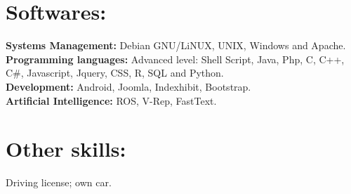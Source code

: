 \documentclass	[10pt,a4paper,oneside]{article}
\newcommand{\seccion}[1]{\vspace*{3mm}\section*{#1}\vspace*{-3mm}}
\begin{document}
\seccion{Softwares:}
\textbf{Systems Management:} Debian GNU/LiNUX, UNIX, Windows and Apache.\\
\textbf{Programming languages:} Advanced level: Shell Script, Java, Php, C,
C++, C\#, Javascript, Jquery, CSS, R, SQL and Python.\\
\textbf{Development:} Android, Joomla, Indexhibit, Bootstrap.\\
\textbf{Artificial Intelligence:} ROS, V-Rep, FastText.


\seccion{Other skills:}
Driving license; own car.\\
\end{document}
